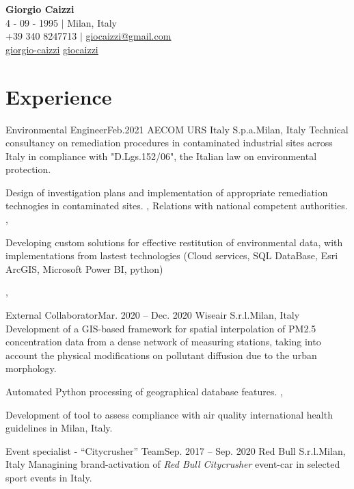 \documentclass[letterpaper,11pt]{article}
\begin{document}
\begin{center}
  \textbf{\Huge \bfseries Giorgio Caizzi} \\
  \vspace{2pt} 4 - 09 - 1995 $|$ Milan, Italy \\
  \small +39 340 8247713 $|$ \href{mailto:x@x.com}{\underline{giocaizzi@gmail.com}}\\
  \faLinkedinSquare{ : }\href{https://linkedin.com/in/giorgio-caizzi/}{\underline{giorgio-caizzi}}
  \faGithubSquare{ : }\href{https://www.github.com/giocaizzi/}{\underline{giocaizzi}}\\
\end{center}

\section{Experience}
\sectionElementListStart

\sectionElement
{Environmental Engineer}{Feb.2021}
{AECOM URS Italy S.p.a.}{Milan, Italy}
{
  Technical consultancy on remediation procedures in contaminated industrial sites across Italy
  in compliance with "D.Lgs.152/06", the Italian law on environmental protection.
}
{
  {
      Design of investigation plans and implementation of appropriate remediation technogies in contaminated sites.
    },
  {
      Relations with national competent authorities.
    },
  {
      Developing custom solutions for effective restitution of environmental data, with implementations from lastest technologies (Cloud services, SQL DataBase, Esri ArcGIS, Microsoft Power BI, python)

    },
}

\sectionElement
{External Collaborator}{Mar. 2020 -- Dec. 2020}
{Wiseair S.r.l.}{Milan, Italy}
{
  Development of a GIS-based framework for spatial interpolation of PM2.5 concentration
  data from a dense network of measuring stations, taking into account the physical
  modifications on pollutant diffusion due to the urban morphology.
}
{
  {
      Automated Python processing of geographical database features.
    },
  {
      Development of tool to assess compliance with air quality international health guidelines
      in Milan, Italy.

    }
}

\sectionElement
{Event specialist - “Citycrusher” Team}{Sep. 2017 -- Sep. 2020}
{Red Bull S.r.l.}{Milan, Italy}
{Managining brand-activation of \textit{Red Bull Citycrusher} event-car in selected sport
  events in Italy.}
{}
\end{document}
